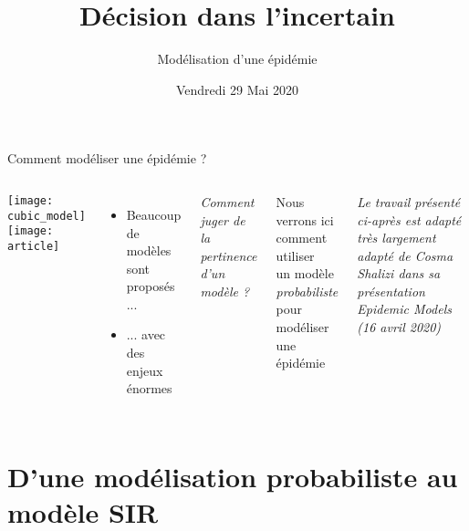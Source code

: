 \documentclass[10pt]{beamer}
\title{Décision dans l'incertain}
\subtitle{Modélisation d'une épidémie}
\date{Vendredi 29 Mai 2020}
\begin{document}
\begin{frame}
  \maketitle
\end{frame}

\begin{frame}{Comment modéliser une épidémie ?}
  \begin{columns}
    \texttt{[image: cubic\_model]}
    \texttt{[image: article]}
    \begin{itemize}
      \item Beaucoup de modèles sont proposés ...
      \item ... avec des enjeux énormes
    \end{itemize}
    \emph{Comment juger de la pertinence d'un modèle ?}

    \vspace{.5cm}

    \pause
    \alert{Nous verrons ici comment utiliser \\
    un modèle \emph{probabiliste} pour modéliser
    une épidémie}

    \vspace{.5cm}

    \emph{Le travail présenté ci-après est adapté très largement
      adapté de Cosma Shalizi dans sa présentation \emph{Epidemic Models}
      (16 avril 2020)
    }
  \end{columns}
\end{frame}

\section{D'une modélisation probabiliste au modèle SIR}
\end{document}
